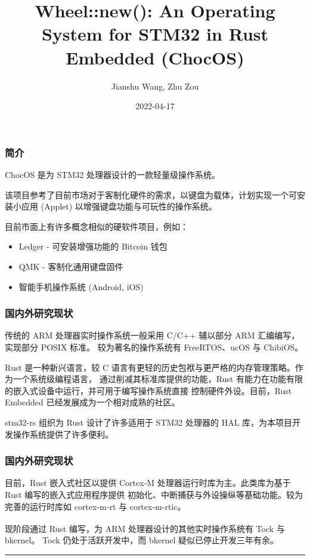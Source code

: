 \documentclass[aspectratio=169]{beamer}
\title{Wheel::new(): An Operating System for STM32 in Rust Embedded (ChocOS)}
\author{Jianshu Wang, Zhu Zou}
\date{2022-04-17}
\begin{document}
\maketitle

\begin{frame}
    \frametitle{简介}
    ChocOS 是为 STM32 处理器设计的一款轻量级操作系统。
    \par
    该项目参考了目前市场对于客制化硬件的需求，以键盘为载体，计划实现一个可安装小应用 (Applet) 
    以增强键盘功能与可玩性的操作系统。
    \par
    目前市面上有许多概念相似的硬软件项目，例如：
    \begin{itemize}
        \item Ledger - 可安装增强功能的 Bitcoin 钱包
        \item QMK - 客制化通用键盘固件
        \item 智能手机操作系统 (Android, iOS)
    \end{itemize}
\end{frame}

\begin{frame}
    \frametitle{国内外研究现状}

    传统的 ARM 处理器实时操作系统一般采用 C/C++ 辅以部分 ARM 汇编编写，实现部分 POSIX 标准。
    较为著名的操作系统有 FreeRTOS、ucOS 与 ChibiOS。
    \par
    Rust 是一种新兴语言，较 C 语言有更轻的历史包袱与更严格的内存管理策略。作为一个系统级编程语言，
    通过削减其标准库提供的功能，Rust 有能力在功能有限的嵌入式设备中运行，并可用于编写操作系统直接
    控制硬件外设。目前，Rust Embedded 已经发展成为一个相对成熟的社区。
    \par
    stm32-rs 组织为 Rust 设计了许多适用于 STM32 处理器的 HAL 库，为本项目开发操作系统提供了许多便利。

\end{frame}

\begin{frame}
    \frametitle{国内外研究现状}

    目前，Rust 嵌入式社区以提供 Cortex-M 处理器运行时库为主。此类库为基于 Rust 编写的嵌入式应用程序提供
    初始化、中断捕获与外设操纵等基础功能。较为完善的运行时库如 cortex-m-rt 与 cortex-m-rtic。
    \par
    现阶段通过 Rust 编写，为 ARM 处理器设计的其他实时操作系统有 Tock\textsuperscript{\cite{levy17multiprogramming}} 与 bkernel。
    Tock 仍处于活跃开发中，而 bkernel 疑似已停止开发三年有余。

    \par

    \vfill
    \noindent\rule{2cm}{0.4pt}
    \printbibliography

\end{frame}
\end{document}
